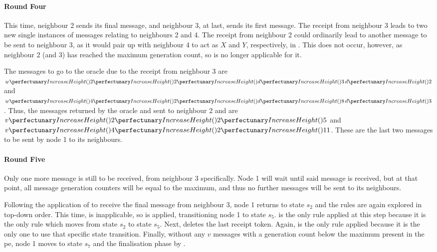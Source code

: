 \paragraph{Round Four}
This time, neighbour 2 sends its final message, and neighbour 3, at last, sends its first message.  The receipt from neighbour 3 leads to two new single instances of messages relating to neighbours 2 and 4.  The receipt from neighbour 2 could ordinarily lead to another message to be sent to neighbour 3, as it would pair up with neighbour 4 to act as \(X\) and \(Y\), respectively, in .  This does not occur, however, as neighbour 2 (and 3) has reached the maximum generation count, so  is no longer applicable for it.

The messages to go to the oracle due to the receipt from neighbour 3 are \(\cpvw{2}{2}{\cpfunc{d}{3} \, \cpfunc{d}{2}}\) and \(\cpvw{4}{2}{\cpfunc{d}{8} \, \cpfunc{d}{3}}\).  Thus, the messages returned by the oracle and sent to neighbour 2 and are \(\cpvv{2}{2}{5}\) and \(\cpvv{4}{2}{11}\).  These are the last two messages to be sent by node 1 to its neighbours.

\paragraph{Round Five}
Only one more message is still to be received, from neighbour 3 specifically. Node 1 will wait until said message is received, but at that point, all message generation counters will be equal to the maximum, and thus no further messages will be sent to its neighbours.

Following the application of  to receive the final message from neighbour 3, node 1 returns to state \(s_2\) and the rules are again explored in top-down order.  This time,  is inapplicable, so  is applied, transitioning node 1 to state \(s_5\).   is the only rule applied at this step because it is the only rule which moves from state \(s_2\) to state \(s_5\).  Next,  deletes the last receipt token.  Again,  is the only rule applied because it is the only one to use that specific state transition.  Finally, without any \(v\) messages with a generation count below the maximum present in the \gls{pe}, node 1 moves to state \(s_7\) and the finalisation phase by .

